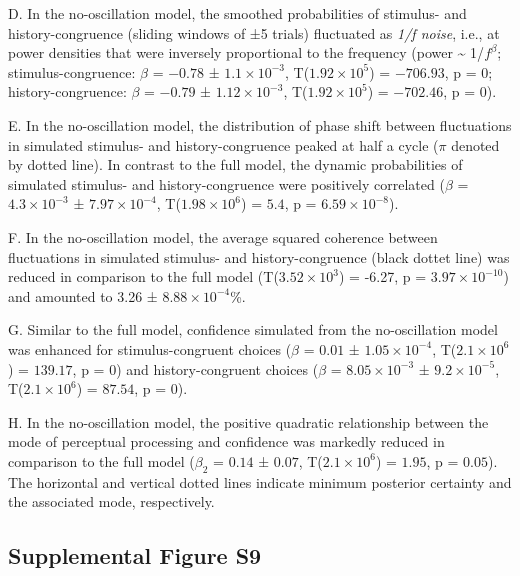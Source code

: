 \documentclass[
]{article}
\begin{document}
D. In the no-oscillation model, the smoothed probabilities of stimulus-
and history-congruence (sliding windows of ±5 trials) fluctuated as
\emph{1/f noise}, i.e., at power densities that were inversely
proportional to the frequency (power \textasciitilde{} 1/\(f^\beta\);
stimulus-congruence: \(\beta\) = \(-0.78\) ±
\(\ensuremath{1.1\times 10^{-3}}\),
T(\(\ensuremath{1.92\times 10^{5}}\)) = \(-706.93\), p = \(0\);
history-congruence: \(\beta\) = \(-0.79\) ±
\(\ensuremath{1.12\times 10^{-3}}\),
T(\(\ensuremath{1.92\times 10^{5}}\)) = \(-702.46\), p = \(0\)).

E. In the no-oscillation model, the distribution of phase shift between
fluctuations in simulated stimulus- and history-congruence peaked at
half a cycle (\(\pi\) denoted by dotted line). In contrast to the full
model, the dynamic probabilities of simulated stimulus- and
history-congruence were positively correlated (\(\beta\) =
\(\ensuremath{4.3\times 10^{-3}}\) ±
\(\ensuremath{7.97\times 10^{-4}}\),
T(\(\ensuremath{1.98\times 10^{6}}\)) = \(5.4\), p =
\(\ensuremath{6.59\times 10^{-8}}\)).

F. In the no-oscillation model, the average squared coherence between
fluctuations in simulated stimulus- and history-congruence (black dottet
line) was reduced in comparison to the full model
(T(\ensuremath{3.52\times 10^{3}}) = -6.27, p =
\(\ensuremath{3.97\times 10^{-10}}\)) and amounted to 3.26 ±
\ensuremath{8.88\times 10^{-4}}\%.

G. Similar to the full model, confidence simulated from the
no-oscillation model was enhanced for stimulus-congruent choices
(\(\beta\) = \(0.01\) ± \(\ensuremath{1.05\times 10^{-4}}\),
T(\(\ensuremath{2.1\times 10^{6}}\)) = \(139.17\), p = \(0\)) and
history-congruent choices (\(\beta\) =
\(\ensuremath{8.05\times 10^{-3}}\) ±
\(\ensuremath{9.2\times 10^{-5}}\), T(\(\ensuremath{2.1\times 10^{6}}\))
= \(87.54\), p = \(0\)).

H. In the no-oscillation model, the positive quadratic relationship
between the mode of perceptual processing and confidence was markedly
reduced in comparison to the full model (\(\beta_2\) = \(0.14\) ±
\(0.07\), T(\(\ensuremath{2.1\times 10^{6}}\)) = \(1.95\), p =
\(0.05\)). The horizontal and vertical dotted lines indicate minimum
posterior certainty and the associated mode, respectively.

\newpage

\hypertarget{supplemental-figure-s9}{%
\subsection{Supplemental Figure S9}\label{supplemental-figure-s9}}
\end{document}
